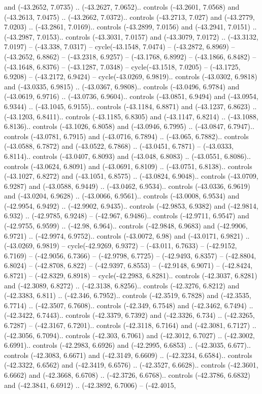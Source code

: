 \begin{scope}[shift={(2.5552, 9.9912)}]
\begin{scope}[shift={(48.1654, -14.8546)}]
and (-43.2652, 7.0735) .. (-43.2627, 7.0652).. controls (-43.2601, 7.0568) and (-43.2613, 7.0475) .. (-43.2662, 7.0372).. controls (-43.2713, 7.027) and (-43.2779, 7.0203) .. (-43.2861, 7.0169).. controls (-43.2899, 7.0156) and (-43.2941, 7.0151) .. (-43.2987, 7.0153).. controls (-43.3031, 7.0157) and (-43.3079, 7.0172) .. (-43.3132, 7.0197) -- (-43.338, 7.0317) -- cycle(-43.1548, 7.0474) -- (-43.2872, 6.8969) -- (-43.2652, 6.8862) -- (-43.2318, 6.9257) -- (-43.1768, 6.8992) -- (-43.1866, 6.8482) -- (-43.1648, 6.8376) -- (-43.1287, 7.0348) -- cycle(-43.1518, 7.0205) -- (-43.1725, 6.9208) -- (-43.2172, 6.9424) -- cycle(-43.0269, 6.9819).. controls (-43.0302, 6.9818) and (-43.0335, 6.9815) .. (-43.0367, 6.9808).. controls (-43.0496, 6.9784) and (-43.0619, 6.9716) .. (-43.0736, 6.9604).. controls (-43.0851, 6.9494) and (-43.0954, 6.9344) .. (-43.1045, 6.9155).. controls (-43.1184, 6.8871) and (-43.1237, 6.8623) .. (-43.1203, 6.8411).. controls (-43.1185, 6.8305) and (-43.1147, 6.8214) .. (-43.1088, 6.8136).. controls (-43.1026, 6.8058) and (-43.0946, 6.7995) .. (-43.0847, 6.7947).. controls (-43.0781, 6.7915) and (-43.0716, 6.7894) .. (-43.065, 6.7882).. controls (-43.0588, 6.7872) and (-43.0522, 6.7868) .. (-43.0451, 6.7871) -- (-43.0333, 6.8114).. controls (-43.0407, 6.8093) and (-43.048, 6.8083) .. (-43.0551, 6.8086).. controls (-43.0624, 6.8091) and (-43.0691, 6.8109) .. (-43.0751, 6.8138).. controls (-43.1027, 6.8272) and (-43.1051, 6.8575) .. (-43.0824, 6.9048).. controls (-43.0709, 6.9287) and (-43.0588, 6.9449) .. (-43.0462, 6.9534).. controls (-43.0336, 6.9619) and (-43.0204, 6.9628) .. (-43.0066, 6.9561).. controls (-43.0008, 6.9534) and (-42.9954, 6.9492) .. (-42.9902, 6.9435).. controls (-42.9853, 6.9382) and (-42.9814, 6.932) .. (-42.9785, 6.9248) -- (-42.967, 6.9486).. controls (-42.9711, 6.9547) and (-42.9755, 6.9599) .. (-42.98, 6.964).. controls (-42.9848, 6.9683) and (-42.9906, 6.9721) .. (-42.9974, 6.9752).. controls (-43.0072, 6.98) and (-43.0171, 6.9821) .. (-43.0269, 6.9819) -- cycle(-42.9269, 6.9372) -- (-43.011, 6.7633) -- (-42.9152, 6.7169) -- (-42.9056, 6.7366) -- (-42.9798, 6.7725) -- (-42.9493, 6.8357) -- (-42.8804, 6.8024) -- (-42.8708, 6.822) -- (-42.9397, 6.8553) -- (-42.9148, 6.9071) -- (-42.8424, 6.8721) -- (-42.8329, 6.8918) -- cycle(-42.2983, 6.8281).. controls (-42.3037, 6.8281) and (-42.3089, 6.8272) .. (-42.3138, 6.8256).. controls (-42.3276, 6.8212) and (-42.3383, 6.811) .. (-42.346, 6.7952).. controls (-42.3519, 6.7828) and (-42.3535, 6.7714) .. (-42.3507, 6.7608).. controls (-42.349, 6.7548) and (-42.3462, 6.7494) .. (-42.3422, 6.7443).. controls (-42.3379, 6.7392) and (-42.3326, 6.734) .. (-42.3265, 6.7287) -- (-42.3167, 6.7201).. controls (-42.3118, 6.7164) and (-42.3081, 6.7127) .. (-42.3056, 6.7094).. controls (-42.303, 6.7061) and (-42.3012, 6.7027) .. (-42.3002, 6.6991).. controls (-42.2983, 6.6926) and (-42.2995, 6.6853) .. (-42.3035, 6.677).. controls (-42.3083, 6.6671) and (-42.3149, 6.6609) .. (-42.3234, 6.6584).. controls (-42.3322, 6.6562) and (-42.3419, 6.6576) .. (-42.3527, 6.6628).. controls (-42.3601, 6.6662) and (-42.3668, 6.6708) .. (-42.3726, 6.6768).. controls (-42.3786, 6.6832) and (-42.3841, 6.6912) .. (-42.3892, 6.7006) -- (-42.4015, 
\end{scope}
\end{scope}
